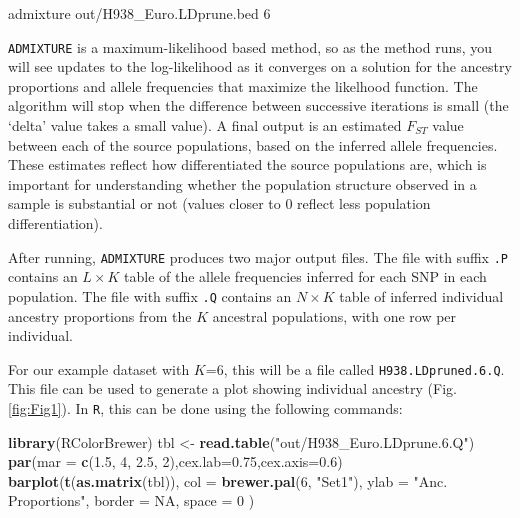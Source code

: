 \documentclass{svmult}       %
\newenvironment{Shaded}{\begin{snugshade}}{\end{snugshade}}
\newcommand{\KeywordTok}[1]{\textcolor[rgb]{0.13,0.29,0.53}{\textbf{#1}}}
\newcommand{\DataTypeTok}[1]{\textcolor[rgb]{0.13,0.29,0.53}{#1}}
\newcommand{\DecValTok}[1]{\textcolor[rgb]{0.00,0.00,0.81}{#1}}
\newcommand{\FloatTok}[1]{\textcolor[rgb]{0.00,0.00,0.81}{#1}}
\newcommand{\StringTok}[1]{\textcolor[rgb]{0.31,0.60,0.02}{#1}}
\newcommand{\OtherTok}[1]{\textcolor[rgb]{0.56,0.35,0.01}{#1}}
\newcommand{\ExtensionTok}[1]{#1}
\newcommand{\NormalTok}[1]{#1}
\begin{document}
\begin{Shaded}
\begin{Highlighting}[]
\ExtensionTok{admixture}\NormalTok{ out/H938_Euro.LDprune.bed 6}
\end{Highlighting}
\end{Shaded}

\texttt{ADMIXTURE} is a maximum-likelihood based method, so as the
method runs, you will see updates to the log-likelihood as it converges
on a solution for the ancestry proportions and allele frequencies that
maximize the likelhood function. The algorithm will stop when the
difference between successive iterations is small (the `delta' value
takes a small value). A final output is an estimated \(F_{ST}\) value
\cite{Kent09} between each of the source populations, based
on the inferred allele frequencies. These estimates reflect how
differentiated the source populations are, which is important for
understanding whether the population structure observed in a sample is
substantial or not (values closer to 0 reflect less population
differentiation).

After running, \texttt{ADMIXTURE} produces two major output files. The
file with suffix \texttt{.P} contains an \(L \times K\) table of the
allele frequencies inferred for each SNP in each population. The file
with suffix \texttt{.Q} contains an \(N \times K\) table of inferred
individual ancestry proportions from the \(K\) ancestral populations,
with one row per individual.

For our example dataset with \(K\)=6, this will be a file called
\texttt{H938.LDpruned.6.Q}. This file can be used to generate a plot
showing individual ancestry (Fig. \ref{fig:Fig1}). In \texttt{R}, this can be done using the
following commands:

\begin{Shaded}
\begin{Highlighting}[]
\KeywordTok{library}\NormalTok{(RColorBrewer)}
\NormalTok{tbl <-}\StringTok{ }\KeywordTok{read.table}\NormalTok{(}\StringTok{"out/H938_Euro.LDprune.6.Q"}\NormalTok{)}
\KeywordTok{par}\NormalTok{(}\DataTypeTok{mar =} \KeywordTok{c}\NormalTok{(}\FloatTok{1.5}\NormalTok{, }\DecValTok{4}\NormalTok{, }\FloatTok{2.5}\NormalTok{, }\DecValTok{2}\NormalTok{),}\DataTypeTok{cex.lab=}\FloatTok{0.75}\NormalTok{,}\DataTypeTok{cex.axis=}\FloatTok{0.6}\NormalTok{)}
\KeywordTok{barplot}\NormalTok{(}\KeywordTok{t}\NormalTok{(}\KeywordTok{as.matrix}\NormalTok{(tbl)),}
  \DataTypeTok{col =} \KeywordTok{brewer.pal}\NormalTok{(}\DecValTok{6}\NormalTok{, }\StringTok{"Set1"}\NormalTok{), }\DataTypeTok{ylab =} \StringTok{"Anc. Proportions"}\NormalTok{,}
  \DataTypeTok{border =} \OtherTok{NA}\NormalTok{, }\DataTypeTok{space =} \DecValTok{0}
\NormalTok{)}
\end{Highlighting}
\end{Shaded}
\end{document}
